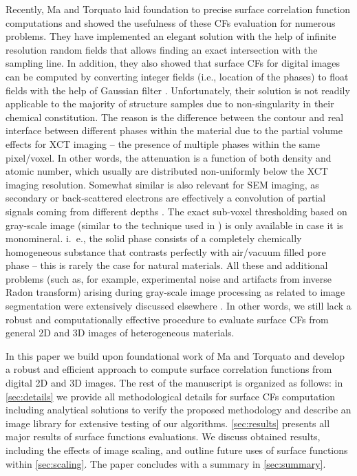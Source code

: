 \documentclass[reprint,amsmath,amssymb,aps,pre]{revtex4-1}
\begin{document}
Recently, Ma and Torquato \cite{Ma_Torq} laid foundation to precise surface
correlation function computations and showed the usefulness of these CFs
evaluation for numerous problems. They have implemented an elegant solution with
the help of infinite resolution random fields that allows finding an exact
intersection with the sampling line. In addition, they also showed that surface
CFs for digital images can be computed by converting integer fields (i.e.,
location of the phases) to float fields with the help of Gaussian filter
\cite{Ma_Torq}. Unfortunately, their solution is not readily applicable to the
majority of structure samples due to non-singularity in their chemical
constitution. The reason is the difference between the contour and real
interface between different phases within the material due to the partial volume
effects \cite{Wildenschild_Sheppard} for XCT imaging -- the presence of multiple
phases within the same pixel/voxel. In other words, the attenuation is a
function of both density and atomic number, which usually are distributed
non-uniformly below the XCT imaging resolution. Somewhat similar is also
relevant for SEM imaging, as secondary or back-scattered electrons are
effectively a convolution of partial signals coming from different depths
\cite{Bultreys_review}. The exact sub-voxel thresholding based on gray-scale
image (similar to the technique used in \cite{Ma_Torq}) is only available in
case it is monomineral. i.~e., the solid phase consists of a completely
chemically homogeneous substance that contrasts perfectly with air/vacuum filled
pore phase -- this is rarely the case for natural materials. All these and
additional problems (such as, for example, experimental noise and artifacts from
inverse Radon transform) arising during gray-scale image processing as related
to image segmentation were extensively discussed elsewhere
\cite{Safonov;Lavrukhin2021}. In other words, we still lack a robust and
computationally effective procedure to evaluate surface CFs from general 2D and
3D images of heterogeneous materials.

In this paper we build upon foundational work of Ma and Torquato \cite{Ma_Torq}
and develop a robust and efficient approach to compute surface correlation
functions from digital 2D and 3D images. The rest of the manuscript is organized
as follows: in \cref{sec:details} we provide all methodological details for
surface CFs computation including analytical solutions to verify the proposed
methodology and describe an image library for extensive testing of our
algorithms. \cref{sec:results} presents all major results of surface functions
evaluations. We discuss obtained results, including the effects of image
scaling, and outline future uses of surface functions within
\cref{sec:scaling}. The paper concludes with a summary in \cref{sec:summary}.
\end{document}
